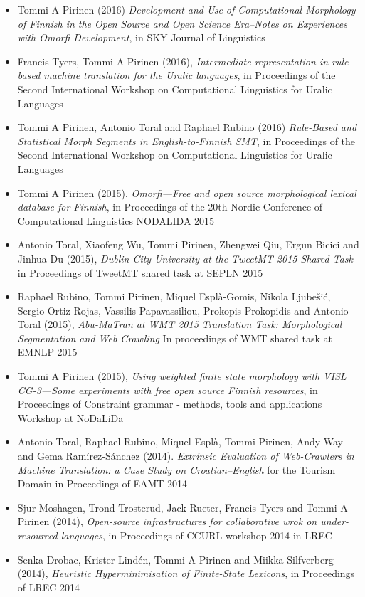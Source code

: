 \documentclass[a4paper]{article}
\begin{document}
\begin{itemize}
\item Tommi A Pirinen (2016) \textit{Development and Use of Computational Morphology of Finnish in the Open Source and Open Science Era–Notes on Experiences with Omorfi Development}, in SKY Journal of Linguistics
\item Francis Tyers, Tommi A Pirinen (2016), \textit{Intermediate representation in rule-based machine translation for the Uralic languages}, in  Proceedings of the Second International Workshop on Computational Linguistics for Uralic Languages
\item Tommi A Pirinen, Antonio Toral and Raphael Rubino (2016) \textit{Rule-Based and Statistical Morph Segments in English-to-Finnish SMT}, in Proceedings of the Second International Workshop on Computational Linguistics for Uralic Languages
\item Tommi A Pirinen (2015), \textit{Omorfi—Free and open source morphological lexical database for Finnish}, in Proceedings of the 20th Nordic Conference of Computational Linguistics NODALIDA 2015
\item Antonio Toral, Xiaofeng Wu, Tommi Pirinen, Zhengwei Qiu, Ergun Bicici and Jinhua Du (2015), \textit{Dublin City University at the TweetMT 2015 Shared Task} in Proceedings of TweetMT shared task at SEPLN 2015
\item Raphael Rubino, Tommi Pirinen, Miquel Esplà-Gomis, Nikola Ljubešić, Sergio Ortiz Rojas, Vassilis Papavassiliou, Prokopis Prokopidis and Antonio Toral (2015), \textit{Abu-MaTran at WMT 2015 Translation Task: Morphological Segmentation and Web Crawling} In proceedings of WMT shared task at EMNLP 2015
\item Tommi A Pirinen (2015), \textit{Using weighted finite state morphology with VISL CG-3—Some experiments with free open source Finnish resources}, in Proceedings of Constraint grammar - methods, tools and applications Workshop at NoDaLiDa
\item Antonio Toral, Raphael Rubino, Miquel Esplà, Tommi Pirinen, Andy Way and Gema Ramírez-Sánchez (2014). \textit{Extrinsic Evaluation of Web-Crawlers in Machine Translation: a Case Study on Croatian–English} for the Tourism Domain in Proceedings of EAMT 2014
\item Sjur Moshagen, Trond Trosterud, Jack Rueter, Francis Tyers and Tommi A Pirinen (2014), \textit{Open-source infrastructures for collaborative wrok on under-resourced languages}, in Proceedings of CCURL workshop 2014 in LREC
\item Senka Drobac, Krister Lindén, Tommi A Pirinen and Miikka Silfverberg (2014), \textit{Heuristic Hyperminimisation of Finite-State Lexicons}, in Proceedings of LREC 2014

\end{itemize}
\end{document}
